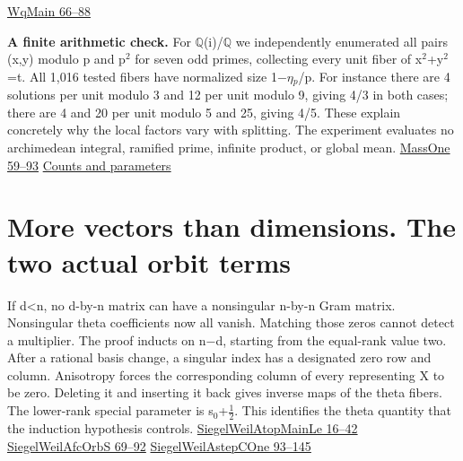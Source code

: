 \documentclass[11pt,letterpaper]{article}
\begin{document}
\href{https://github.com/nousentllc/riemann-hypothesis/blob/40e56bab026552e089d7afcfeff08d2defb9c005/src/Development/WeilBound/CoreStatements/AutomorphicKernels/SiegelWeilFormula/WhittakerEqualRank/WqMain.lean\#L66-L88}{WqMain 66–88}

\textbf{A finite arithmetic check.} For \ensuremath{\mathbb{Q}}(i)/\ensuremath{\mathbb{Q}} we independently enumerated all pairs (x,y) modulo p and p\ensuremath{{}^{2}} for seven odd primes, collecting every unit fiber of x\ensuremath{{}^{2}}+y\ensuremath{{}^{2}}=t. All 1,016 tested fibers have normalized size 1\ensuremath{-}\ensuremath{\eta}\ensuremath{{}_{p}}/p. For instance there are 4 solutions per unit modulo 3 and 12 per unit modulo 9, giving 4/3 in both cases; there are 4 and 20 per unit modulo 5 and 25, giving 4/5. These explain concretely why the local factors vary with splitting. The experiment evaluates no archimedean integral, ramified prime, infinite product, or global mean. \href{https://github.com/nousentllc/riemann-hypothesis/blob/40e56bab026552e089d7afcfeff08d2defb9c005/src/Development/WeilBound/CoreStatements/AutomorphicKernels/SiegelWeilFormula/MassOneBase/MassOne.lean\#L59-L93}{MassOne 59–93} \href{https://github.com/nousentllc/riemann-hypothesis/blob/2c03d15e908bcbe4aae3c94a87c7ada402cd7911/research/uriel/experiments/siegel-weil-constant-term/local_norms.json}{Counts and parameters}

\section{More vectors than dimensions. The two actual orbit terms}
If d<n, no d-by-n matrix can have a nonsingular n-by-n Gram matrix. Nonsingular theta coefficients now all vanish. Matching those zeros cannot detect a multiplier. The proof inducts on n\ensuremath{-}d, starting from the equal-rank value two. After a rational basis change, a singular index has a designated zero row and column. Anisotropy forces the corresponding column of every representing X to be zero. Deleting it and inserting it back gives inverse maps of the theta fibers. The lower-rank special parameter is s\ensuremath{{}_{0}}+\ensuremath{\frac{1}{2}}. This identifies the theta quantity that the induction hypothesis controls. \href{https://github.com/nousentllc/riemann-hypothesis/blob/40e56bab026552e089d7afcfeff08d2defb9c005/src/Development/AutomorphicArithmetic/Foundations/GaloisRepresentations/ThetaParseval/ThetaKernels/SiegelWeilAtopMainLe.lean\#L16-L42}{SiegelWeilAtopMainLe 16–42} \href{https://github.com/nousentllc/riemann-hypothesis/blob/40e56bab026552e089d7afcfeff08d2defb9c005/src/Development/AutomorphicArithmetic/Foundations/GaloisRepresentations/ThetaParseval/ThetaKernels/SiegelWeilAfcOrbS.lean\#L69-L92}{SiegelWeilAfcOrbS 69–92} \href{https://github.com/nousentllc/riemann-hypothesis/blob/40e56bab026552e089d7afcfeff08d2defb9c005/src/Development/AutomorphicArithmetic/Foundations/GaloisRepresentations/ThetaParseval/ThetaKernels/SiegelWeilAstepCOne.lean\#L93-L145}{SiegelWeilAstepCOne 93–145}
\end{document}
